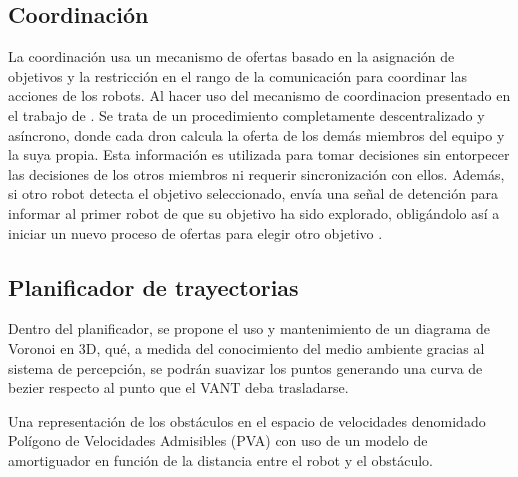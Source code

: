 \subsection*{Coordinación}

La coordinación usa un mecanismo de ofertas basado en la asignación de objetivos y la restricción en el rango de la comunicación para coordinar las acciones de los robots. Al hacer uso del mecanismo de coordinacion presentado en el trabajo de \citeauthor{CINVESTAM2013}. Se trata de un procedimiento completamente descentralizado y asíncrono, donde cada dron calcula la oferta de los demás miembros del equipo y la suya propia. Esta información es utilizada para tomar decisiones sin entorpecer las decisiones de los otros miembros ni requerir sincronización con ellos. Además, si otro robot detecta el objetivo seleccionado, envía una señal de detención para informar al primer robot de que su objetivo ha sido explorado, obligándolo así a iniciar un nuevo proceso de ofertas para elegir otro objetivo \cite{CINVESTAM2013}.



\subsection*{Planificador de trayectorias}
Dentro del planificador, se propone el uso y mantenimiento de un diagrama de Voronoi en 3D, qué, a medida del conocimiento del medio ambiente gracias al sistema de percepción, se podrán suavizar los puntos generando una curva de bezier respecto al punto que el VANT deba trasladarse.

Una representación de los obstáculos en el espacio de velocidades denomidado Polígono de Velocidades Admisibles (PVA) \cite{ramirez2001} con uso de un modelo de amortiguador en función de la distancia entre el robot y el obstáculo.

